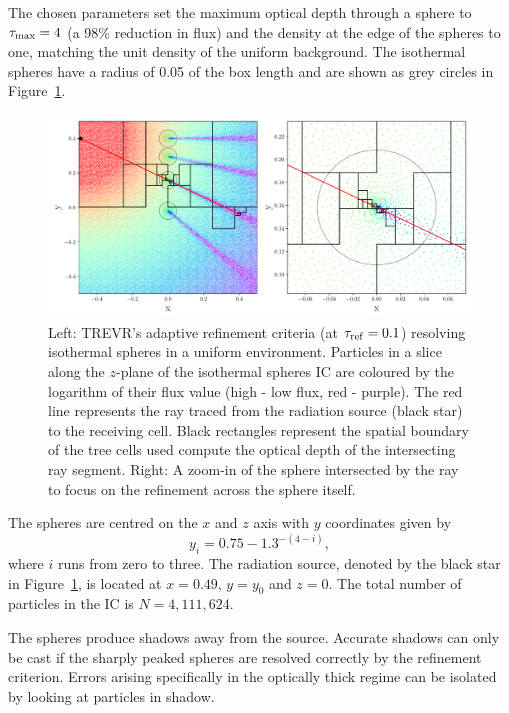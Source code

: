 \documentclass[fleq,usenatbib]{mnras}
\newcommand{\acro}{TREVR}
\newcommand{\tr}{\tau_{\rm ref}}
\begin{document}
{The chosen parameters set the maximum optical depth through a sphere to 
$\tau_{\rm max}=4$ (a 98\% reduction in flux) and the density at the edge of 
the spheres to one, matching the unit density of the uniform background. The 
isothermal spheres have a radius of 0.05 of the box length and are shown as 
grey circles in Figure~\ref{fig:cellplot}.  
\begin{figure}
\includegraphics[width=1\linewidth]{Figures/cellplot.pdf}
\caption{Left: \acro{}'s adaptive refinement criteria (at $\tr =0.1$) 
resolving isothermal spheres in a uniform environment. Particles in a slice 
along the $z$-plane of the isothermal spheres IC are coloured by the logarithm 
of their flux value (high - low flux, red - purple). The red line represents 
the ray traced from the radiation source (black star) to the receiving cell. 
Black rectangles represent the spatial boundary of the tree cells used compute 
the optical depth of the intersecting ray segment. Right: A zoom-in of the 
sphere intersected by the ray to focus on the refinement across the sphere 
itself.}
\label{fig:cellplot}
\end{figure}
The spheres are centred on the $x$ and $z$ axis with $y$ coordinates given by
\begin{equation}
y_i = 0.75 - 1.3^{-(4-i)},
\end{equation}
where $i$ runs from zero to three. The radiation source, denoted by the black 
star in Figure~\ref{fig:cellplot}, is located at $x=0.49$, $y=y_0$ and $z=0$. 
The total number of particles in the IC is $N=4,111,624$.

The spheres produce shadows away from the source. Accurate shadows can only be 
cast if the sharply peaked spheres are resolved correctly by the refinement 
criterion. Errors arising  specifically in the optically thick regime can be 
isolated by looking at particles in shadow.

}
\end{document}
